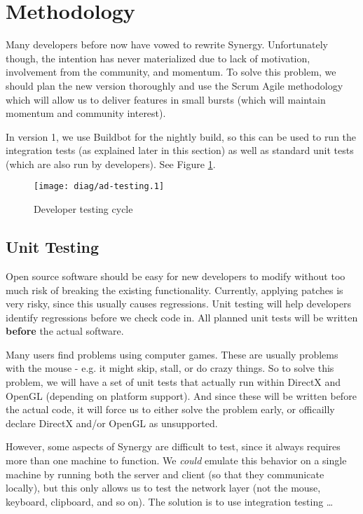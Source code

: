 \section{Methodology}

Many developers before now have vowed to rewrite Synergy. Unfortunately though,
the intention has never materialized due to lack of motivation, involvement from
the community, and momentum.
To solve this problem, we should plan the new version thoroughly and use the
Scrum Agile methodology which will allow us to deliver features in small 
bursts (which will maintain momentum and community interest).

In version 1, we use Buildbot for the nightly build, so this can be used to run
the integration tests (as explained later in this section) as well as standard 
unit tests (which are also run by developers). See Figure \ref{fig:devTesting}.

\begin{figure}[ht!]
  \centering
  \texttt{[image: diag/ad-testing.1]}
  \caption{Developer testing cycle}
  \label{fig:devTesting}
\end{figure}

\subsection{Unit Testing}

Open source software should be easy for new developers to modify without too
much risk of breaking the existing functionality. Currently, applying patches 
is very risky, since this usually causes regressions. Unit testing will help 
developers identify regressions before we check code in. All planned unit tests
will be written \textbf{before} the actual software.

Many users find problems using computer games. These are usually problems with
the mouse - e.g. it might skip, stall, or do crazy things. So to solve this 
problem, we will have a set of unit tests that actually run within DirectX and
OpenGL (depending on platform support). And since these will be written before
the actual code, it will force us to either solve the problem early, or 
officailly declare DirectX and/or OpenGL as unsupported.

However, some aspects of Synergy are difficult to test, since it always requires
more than one machine to function. We \textit{could} emulate this behavior on a 
single machine by running both the server and client (so that they communicate 
locally), but this only allows us to test the network layer (not the mouse,
keyboard, clipboard, and so on). The solution is to use integration testing
\ldots

